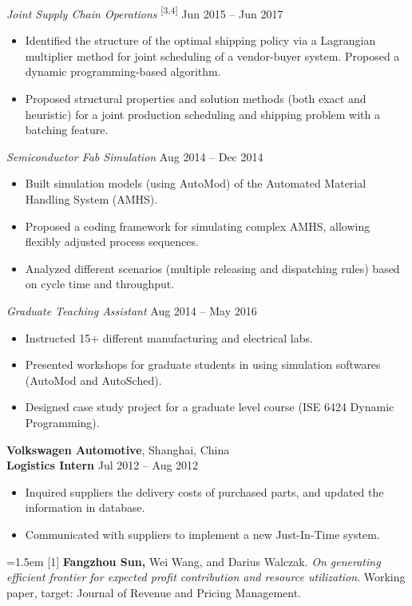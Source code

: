 \documentclass[11pt,letterpaper]{article}
\newcommand{\mhead}[1]{\leavevmode\marginpar{\small\sffamily #1}}
\begin{document}
\smallskip
\textit{Joint Supply Chain Operations} \textsuperscript{[3,4]}   \hfill{{Jun 2015 -- Jun 2017}} 
\begin{itemize}
	\item Identified the structure of the optimal shipping policy via a Lagrangian multiplier method for joint scheduling of a vendor-buyer system. Proposed a dynamic programming-based algorithm.
	\item Proposed structural properties and solution methods (both exact and heuristic) for a joint production scheduling and shipping problem with a batching feature.
\end{itemize}


\smallskip 
\textit{Semiconductor Fab Simulation} \hfill{{Aug 2014 -- Dec 2014}} 
\begin{itemize}
\item Built simulation models (using AutoMod) of the Automated Material Handling System (AMHS).
\item Proposed a coding framework for simulating complex AMHS, allowing flexibly adjusted process sequences.
\item Analyzed different scenarios (multiple releasing and dispatching rules) based on cycle time and throughput. 
\end{itemize}


\smallskip 
\textit{Graduate Teaching Assistant} \hfill{{Aug 2014 -- May 2016}} 
\begin{itemize}
	\item Instructed 15+ different manufacturing and electrical labs.
 	\item Presented workshops for graduate students in using simulation softwares (AutoMod and AutoSched).
 	\item Designed case study project for a graduate level course (ISE 6424 Dynamic Programming).
\end{itemize}

\medskip
\textbf{Volkswagen Automotive}, Shanghai, China  \\
\textbf{Logistics Intern} \hfill{Jul 2012 -- Aug 2012}
\begin{itemize}
  \item Inquired suppliers the delivery costs of purchased parts, and updated the information in database.
  \item Communicated with suppliers to implement a new Just-In-Time system.	
\end{itemize}

 
\bigskip
\mhead{Publications}%
\hangindent=1.5em [1] \textbf{Fangzhou Sun,} Wei Wang, and Darius Walczak. \emph{On generating efficient frontier for expected profit contribution and resource utilization}. Working paper, target: Journal of Revenue and Pricing Management. 
\end{document}
